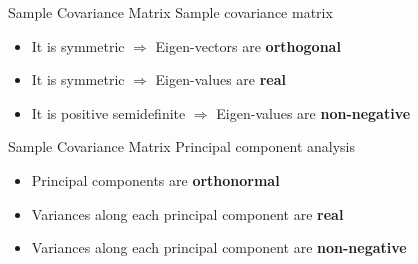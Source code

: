 \documentclass[serif, aspectratio=169]{beamer}
\begin{document}

\begin{frame}{Sample Covariance Matrix}
    Sample covariance matrix 
    \begin{itemize}
        \item It is symmetric $\Rightarrow$ Eigen-vectors are \textbf{orthogonal}
        \item It is symmetric $\Rightarrow$ Eigen-values are \textbf{real}
        \item It is positive semidefinite $\Rightarrow$ Eigen-values are \textbf{non-negative}
    \end{itemize}
\end{frame}

\begin{frame}{Sample Covariance Matrix}
    Principal component analysis
    \begin{itemize}
        \item Principal components are \textbf{orthonormal} 
        \item Variances along each principal component are \textbf{real}
        \item Variances along each principal component are \textbf{non-negative}
    \end{itemize}
\end{frame}
\end{document}
